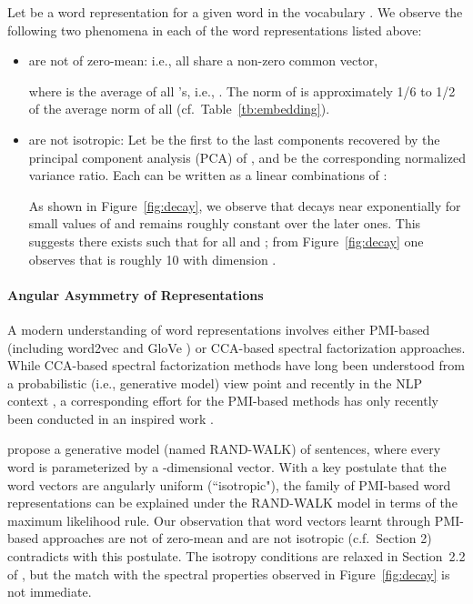 \documentclass{article} \usepackage{acl2017,times}
\begin{document}
Let  be a word representation for a given word  in the vocabulary . We observe the following two phenomena in each of the word representations listed above:
\begin{itemize}[leftmargin=*,,topsep=0pt]
\item  are not of zero-mean: i.e., all  share a non-zero common vector, 
 
where  is the average of all 's, i.e., . The norm of  is approximately 1/6 to 1/2 of the  average norm of all  (cf.\ Table~\ref{tb:embedding}).
\item  are not isotropic: Let  be the first to the last components recovered by the principal component analysis (PCA) of , and  be the corresponding normalized variance ratio. Each  can be written as a linear combinations of :
 
As shown in Figure~\ref{fig:decay}, we observe that  decays near exponentially for  small values of  and  remains roughly constant over the later ones. This suggests there exists  such that  for all  and ;  from Figure~\ref{fig:decay} one observes that  is roughly  10 with  dimension . 
\end{itemize} 

\paragraph{Angular Asymmetry of Representations} A modern understanding of word representations involves either PMI-based  (including word2vec \citep{mikolov2010recurrent,levy2014neural} and GloVe \citep{pennington2014glove}) or CCA-based  spectral factorization approaches. While CCA-based spectral factorization methods have long been understood from  a probabilistic (i.e., generative model) view point  \citep{browne1979maximum,hotelling1936relations} and   recently in the NLP context  \citep{stratos2015model},  a  corresponding  effort for the PMI-based methods has only recently been conducted in an inspired work   \citep{arora2015rand}. 

\citet{arora2015rand}  propose a generative model (named RAND-WALK) of sentences, where  every word is parameterized by a -dimensional vector. With a key postulate that the word vectors are angularly uniform   (``isotropic"), the family of PMI-based word representations can be explained under the RAND-WALK model in terms of the maximum likelihood rule.  
Our observation that word vectors learnt through PMI-based approaches are not of zero-mean and are not isotropic (c.f.\ Section 2) contradicts with this postulate. The isotropy conditions  are  relaxed in Section~2.2  of \citep{arora2015rand}, but the match with the spectral properties observed in Figure~\ref{fig:decay} is not immediate.  
\end{document}
